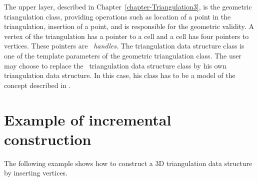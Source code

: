 The upper layer, described in Chapter~\ref{chapter-Triangulation3}, is
the geometric triangulation class, providing operations such as
location of a point in the triangulation, insertion of a point, and is
responsible for the geometric validity. A vertex of the triangulation
has a pointer to a cell and a cell has four pointers to
vertices. These pointers are \cgal\ \emph{handles}. The triangulation
data structure class is one of the template parameters of the
geometric triangulation class. The user may choose to replace the
\cgal\ triangulation data structure class by his own triangulation
data structure. In this case, his class has to be a model of the
concept described in .

\section{Example of incremental construction}
\label{TDS3-sec-examples}
The following example shows how to construct a 3D triangulation data
structure by inserting vertices.


